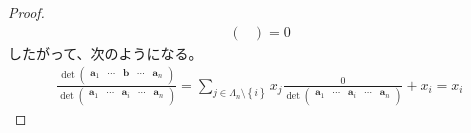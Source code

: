 \documentclass[dvipdfmx]{jsarticle}
\begin{document}
\begin{proof}
\begin{align*}
\begin{pmatrix}
\end{pmatrix} = 0
\end{align*}
したがって、次のようになる。
\begin{align*}
\frac{\det\begin{pmatrix}
\mathbf{a}_{1} & \cdots & \mathbf{b} & \cdots & \mathbf{a}_{n} \\
\end{pmatrix}}{\det\begin{pmatrix}
\mathbf{a}_{1} & \cdots & \mathbf{a}_{i} & \cdots & \mathbf{a}_{n} \\
\end{pmatrix}} = \sum_{j \in \varLambda_{n} \setminus \left\{ i \right\}} {x_{j}\frac{0}{\det\begin{pmatrix}
\mathbf{a}_{1} & \cdots & \mathbf{a}_{i} & \cdots & \mathbf{a}_{n} \\
\end{pmatrix}}} + x_{i} = x_{i}
\end{align*}
\end{proof}
\end{document}
